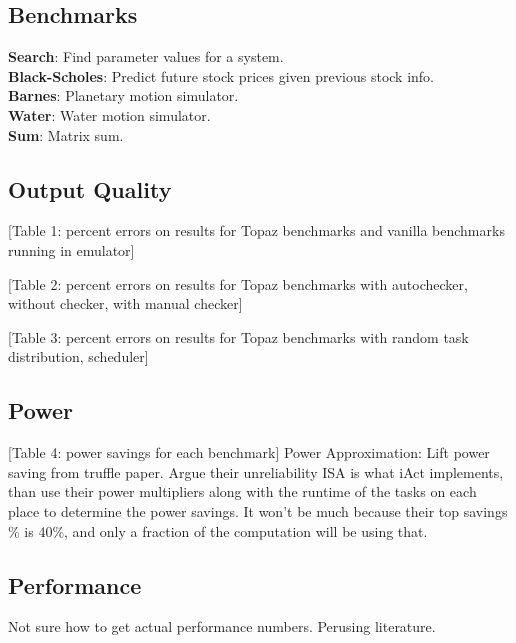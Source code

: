 \documentclass[11pt,twocolumn]{article}
\begin{document}
\subsection {Benchmarks}
\textbf{Search}: Find parameter values for a system.\\
\textbf{Black-Scholes}: Predict future stock prices given previous stock info.\\ 
\textbf{Barnes}: Planetary motion simulator.\\
\textbf{Water}: Water motion simulator.\\
\textbf{Sum}: Matrix sum.\\
\subsection {Output Quality}
[Table 1: percent errors on results for Topaz benchmarks and vanilla benchmarks running in emulator]

[Table 2: percent errors on results for Topaz benchmarks with autochecker, without checker, with manual checker]

[Table 3: percent errors on results for Topaz benchmarks with random task distribution, scheduler]
\subsection {Power}
[Table 4: power savings for each benchmark]
Power Approximation: Lift power saving from truffle paper. Argue their unreliability ISA is what iAct implements, than use their power multipliers along with the runtime of the tasks on each place to determine the power savings. It won't be much because their top savings \% is 40\%, and only a fraction of the computation will be using that. 
\subsection {Performance}
Not sure how to get actual performance numbers. Perusing literature.
\end{document}
